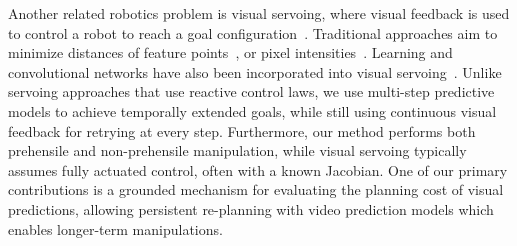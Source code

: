 Another related robotics problem is visual servoing, where visual feedback is used to control a robot to reach a goal configuration~\cite{hutchinson1996tutorial,kragic2002survey,desouza2002survey}.
Traditional approaches aim to minimize distances of feature points~\cite{feddema1989vision,espiau1992servo,wilson1996relative}, or pixel intensities~\cite{caron2013photometric}. Learning and convolutional networks have also been incorporated into visual servoing~\cite{saxena2017servoing,bateux2018servoing,lee2017servoing,google_handeye}. Unlike servoing approaches that use reactive control laws, we use multi-step predictive models to achieve temporally extended goals, while still using continuous visual feedback for retrying at every step. Furthermore, our method performs both prehensile and non-prehensile manipulation, while visual servoing typically assumes fully actuated control, often with a known Jacobian.
One of our primary contributions is a grounded mechanism for evaluating the planning cost of visual predictions, allowing persistent re-planning with video prediction models which enables longer-term manipulations.

%



